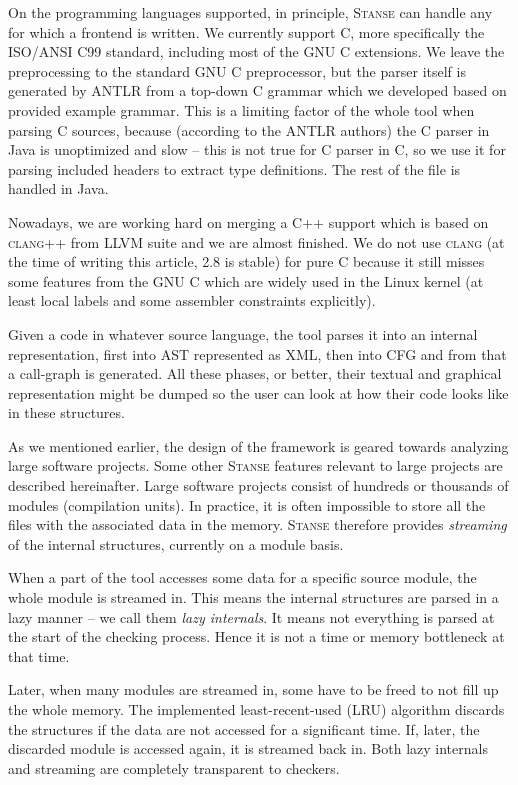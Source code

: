 \documentclass[10pt]{llncs}
\newcommand{\Stanse}{\textsc{Stanse}\xspace}
\begin{document}
On the programming languages supported, in principle, \Stanse can handle any
for which a frontend is written.  We currently support C, more specifically
the ISO/ANSI C99 standard, including most of the GNU C extensions. We leave
the preprocessing to the standard GNU C preprocessor, but the parser itself is
generated by \textsc{ANTLR} from a top-down C grammar which we developed based
on provided example grammar. This is a limiting factor of the whole tool when
parsing C sources, because (according to the \textsc{ANTLR} authors) the C
parser in Java is unoptimized and slow -- this is not true for C parser in C,
so we use it for parsing included headers to extract type definitions. The
rest of the file is handled in Java.

Nowadays, we are working hard on merging a C++ support which is based on
\textsc{clang++} from \textsc{LLVM} suite and we are almost finished. We do
not use \textsc{clang} (at the time of writing this article, 2.8 is stable)
for pure C because it still misses some features from the GNU C which are
widely used in the Linux kernel (at least local labels and some assembler
constraints explicitly).

Given a code in whatever source language, the tool parses it into an internal
representation, first into AST represented as XML, then into CFG and from that
a call-graph is generated. All these phases, or better, their textual and
graphical representation might be dumped so the user can look at how their
code looks like in these structures.

As we mentioned earlier, the design of the framework is geared towards
analyzing large software projects. Some other \Stanse features relevant to
large projects are described hereinafter.  Large software projects consist of
hundreds or thousands of modules (compilation units). In practice, it is often
impossible to store all the files with the associated data in the memory.
\Stanse therefore provides \emph{streaming} of the internal structures,
currently on a module basis.

When a part of the tool accesses some data for a specific source module, the
whole module is streamed in. This means the internal structures are parsed
in a lazy manner -- we call them \emph{lazy internals}. It means not
everything is parsed at the start of the checking process. Hence it is not a
time or memory bottleneck at that time.

Later, when many modules are streamed in, some have to be freed to not fill up
the whole memory. The implemented least-recent-used (LRU) algorithm discards
the structures if the data are not accessed for a significant time. If, later,
the discarded module is accessed again, it is streamed back in. Both lazy
internals and streaming are completely transparent to checkers.
\end{document}
